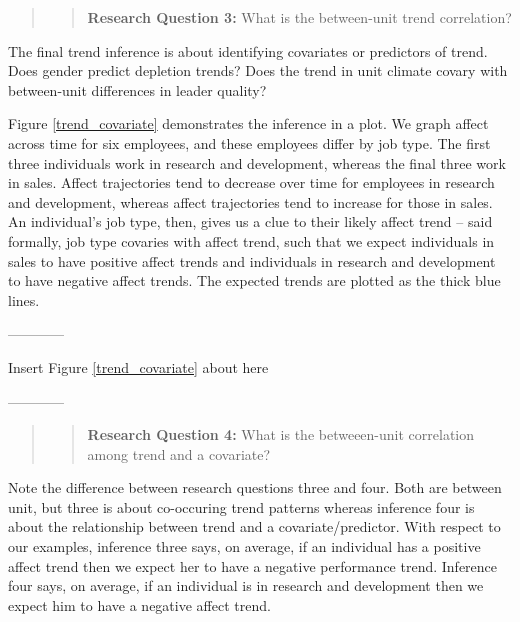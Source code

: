 \documentclass[english,,man]{apa6}
\theoremstyle{definition}
\theoremstyle{definition}
\theoremstyle{definition}
\theoremstyle{remark}
\begin{document}
\begin{quote}
\begin{quote}
\textbf{Research Question 3:} What is the between-unit trend
correlation?
\end{quote}
\end{quote}

The final trend inference is about identifying covariates or predictors
of trend. Does gender predict depletion trends? Does the trend in unit
climate covary with between-unit differences in leader quality?

Figure \ref{trend_covariate} demonstrates the inference in a plot. We
graph affect across time for six employees, and these employees differ
by job type. The first three individuals work in research and
development, whereas the final three work in sales. Affect trajectories
tend to decrease over time for employees in research and development,
whereas affect trajectories tend to increase for those in sales. An
individual's job type, then, gives us a clue to their likely affect
trend -- said formally, job type covaries with affect trend, such that
we expect individuals in sales to have positive affect trends and
individuals in research and development to have negative affect trends.
The expected trends are plotted as the thick blue lines.

\begin{center}

------------

Insert Figure \ref{trend_covariate} about here

------------

\end{center}

\begin{quote}
\begin{quote}
\textbf{Research Question 4:} What is the betweeen-unit correlation
among trend and a covariate?
\end{quote}
\end{quote}

Note the difference between research questions three and four. Both are
between unit, but three is about co-occuring trend patterns whereas
inference four is about the relationship between trend and a
covariate/predictor. With respect to our examples, inference three says,
on average, if an individual has a positive affect trend then we expect
her to have a negative performance trend. Inference four says, on
average, if an individual is in research and development then we expect
him to have a negative affect trend.
\end{document}
